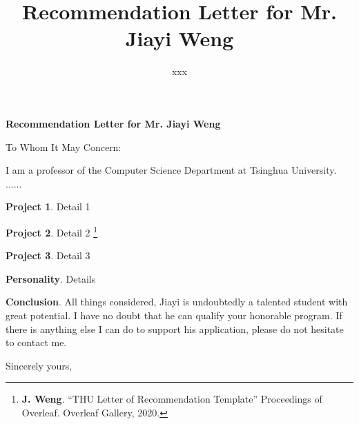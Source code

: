 \documentclass[a4paper]{letter}
\title{\bf Recommendation Letter for Mr. Jiayi Weng}
\author{xxx}
\begin{document}
\begin{letter}{\bf Recommendation Letter for Mr. Jiayi Weng}
\opening{To Whom It May Concern:}

I am a professor of the Computer Science Department at Tsinghua University.  ......

\textbf{Project 1}. Detail 1

\textbf{Project 2}. Detail 2 \footnote{\textbf{J. Weng}. ``THU Letter of Recommendation Template'' Proceedings of Overleaf. Overleaf Gallery, 2020.}

\textbf{Project 3}. Detail 3

\textbf{Personality}. Details

\textbf{Conclusion}. All things considered, Jiayi is undoubtedly a talented student with great potential. I have no doubt that he can qualify your honorable program. If there is anything else I can do to support his application, please do not hesitate to contact me.

\closing{Sincerely yours,\\
\fromsig{%
}
}

\end{letter}
\end{document}
